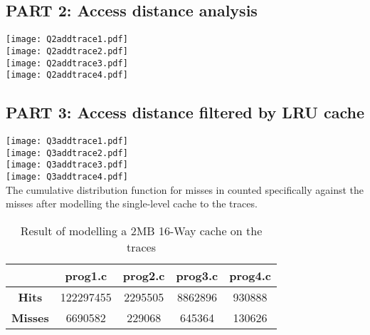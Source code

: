 \newpage
\subsection*{PART 2: Access distance analysis}
\texttt{[image: Q2addtrace1.pdf]} \\
\texttt{[image: Q2addtrace2.pdf]} \\
\texttt{[image: Q2addtrace3.pdf]} \\
\texttt{[image: Q2addtrace4.pdf]} \\


\subsection*{PART 3: Access distance filtered by LRU cache}
\texttt{[image: Q3addtrace1.pdf]} \\
\texttt{[image: Q3addtrace2.pdf]} \\
\texttt{[image: Q3addtrace3.pdf]} \\
\texttt{[image: Q3addtrace4.pdf]} \\

\newpage
The cumulative distribution function for misses in counted specifically against the misses after
modelling the single-level cache to the traces.
\begin{table}[t]
\centering
\begin{tabular}{ |c|c|c|c|c| } 
\hline
& \textbf{prog1.c} & \textbf{prog2.c} & \textbf{prog3.c} & \textbf{prog4.c} \\
\hline
\textbf{Hits}   & 122297455 & 2295505 & 8862896 & 930888 \\
\hline
\textbf{Misses} & 6690582   & 229068  & 645364  & 130626 \\
\hline
\end{tabular}
\caption{Result of modelling a 2MB 16-Way cache on the traces}
\end{table}
